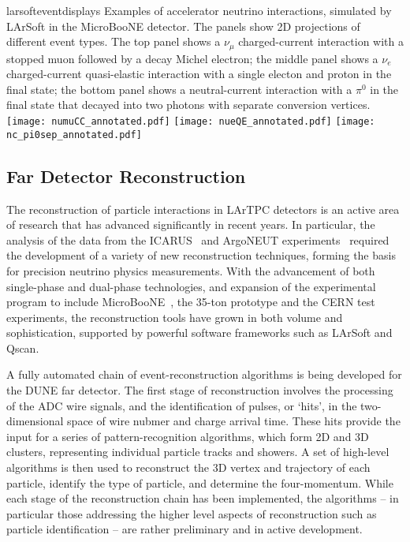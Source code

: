 \begin{cdrfigure}{larsofteventdisplays}
{Examples of accelerator neutrino interactions, simulated by LArSoft in the 
MicroBooNE detector. The panels show 2D projections of different event types.
The top panel shows a $\nu_{\mu}$ charged-current interaction with a stopped muon followed
by a decay Michel electron; the middle panel shows a $\nu_{e}$ charged-current 
quasi-elastic interaction with a single electon and proton in the final state;
the bottom panel shows a neutral-current interaction with a $\pi^{0}$ in the final state
that decayed into two photons with separate conversion vertices.}
\texttt{[image: numuCC\_annotated.pdf]}
\texttt{[image: nueQE\_annotated.pdf]}
\texttt{[image: nc\_pi0sep\_annotated.pdf]}
\end{cdrfigure}

\subsection{Far Detector Reconstruction}
\label{sec:detectors-sc-physics-software-reconstruction-fd}

The reconstruction of particle interactions in LArTPC
detectors is an active area of research that has advanced significantly in recent years.
In particular, the analysis of the data from the ICARUS~\cite{Amerio:2004ze,icarus-url,ICARUS-pizero,Antonello:2012hu} 
and ArgoNEUT experiments~\cite{Adamson:2013/02/28tla,argoneut-url,Acciarri:2013met}
required the development of a variety of new reconstruction techniques,
forming the basis for precision neutrino physics measurements.
With the advancement of both single-phase and dual-phase technologies,
and expansion of the experimental program to include MicroBooNE~\cite{Chen:2007ae,microboone-url},
the 35-ton prototype and the CERN test experiments,
the reconstruction tools have grown in both volume and sophistication,
supported by powerful software frameworks such as LArSoft and Qscan.


A fully automated chain of event-reconstruction algorithms
is being developed for the DUNE far detector.
The first stage of reconstruction involves the processing of the
ADC wire signals, and the identification of pulses, or `hits', in the 
two-dimensional space of wire nubmer and charge arrival time. 
These hits provide the input for a series of pattern-recognition algorithms,
which form 2D and 3D clusters, representing individual particle tracks and showers.
A set of high-level algorithms is then used to reconstruct the 
3D vertex and trajectory of each particle, identify the type of particle, and determine the four-momentum.
While each stage of the reconstruction chain has been implemented, the algorithms -- in
particular those addressing the higher level aspects of reconstruction such as particle identification -- are
rather preliminary and in active development.


